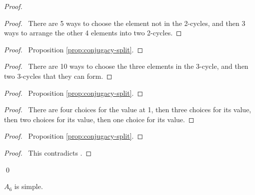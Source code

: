 \begin{proof}
\pf
{}
\begin{proof}
	\pf\ There are 5 ways to choose the element not in the 2-cycles, and then 3 ways to arrange the other 4 elements into two 2-cycles.
\end{proof}
\begin{proof}
	\pf\ Proposition \ref{prop:conjugacy-split}.
\end{proof}
\begin{proof}
	\pf\ There are 10 ways to choose the three elements in the 3-cycle, and then two 3-cycles that they can form.
\end{proof}
\begin{proof}
	\pf\ Proposition \ref{prop:conjugacy-split}.
\end{proof}
\begin{proof}
	\pf\ There are four choices for the value at 1, then three choices for its value, then two choices for its value, then one choice for its value.
\end{proof}
\begin{proof}
	\pf\ Proposition \ref{prop:conjugacy-split}.
\end{proof}
\qedstep
\begin{proof}
	\pf\ This contradicts .
\end{proof}
\qed
\end{proof}

\begin{prop}
\label{prop:A6-simple}
$A_6$ is simple.
\end{prop}

